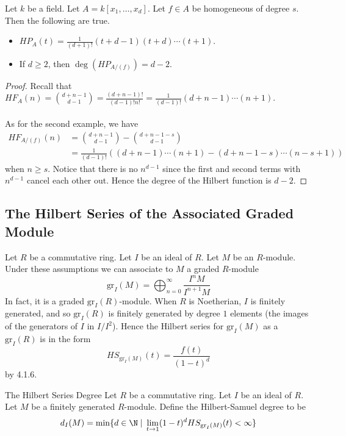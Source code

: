 \documentclass[a4paper]{article}
\begin{document}
\begin{eg}{}{} Let $k$ be a field. Let $A=k[x_1,\dots,x_d]$. Let $f\in A$ be homogeneous of degree $s$. Then the following are true. 
\begin{itemize}
\item $HP_A(t)=\frac{1}{(d+1)!}(t+d-1)(t+d)\cdots(t+1)$. 
\item If $d\geq 2$, then $\deg(HP_{A/(f)})=d-2$. 
\end{itemize} 
\begin{proof}
Recall that $HF_A(n)=\binom{d+n-1}{d-1}=\frac{(d+n-1)!}{(d-1)!n!}=\frac{1}{(d-1)!}(d+n-1)\cdots(n+1)$. \\~\\

As for the second example, we have 
\begin{align*}
HF_{A/(f)}(n)&=\binom{d+n-1}{d-1}-\binom{d+n-1-s}{d-1}\\
&=\frac{1}{(d-1)!}\left((d+n-1)\cdots(n+1)-(d+n-1-s)\cdots(n-s+1)\right)
\end{align*} when $n\geq s$. Notice that there is no $n^{d-1}$ since the first and second terms with $n^{d-1}$ cancel each other out. Hence the degree of the Hilbert function is $d-2$. 
\end{proof}
\end{eg}

\subsection{The Hilbert Series of the Associated Graded Module}
Let $R$ be a commutative ring. Let $I$ be an ideal of $R$. Let $M$ be an $R$-module. Under these assumptions we can associate to $M$ a graded $R$-module $$\text{gr}_I(M)=\bigoplus_{n=0}^\infty\frac{I^nM}{I^{n+1}M}$$ In fact, it is a graded $\text{gr}_I(R)$-module. When $R$ is Noetherian, $I$ is finitely generated, and so $\text{gr}_I(R)$ is finitely generated by degree $1$ elements (the images of the generators of $I$ in $I/I^2$). Hence the Hilbert series for $\text{gr}_I(M)$ as a $\text{gr}_I(R)$ is in the form $$HS_{\text{gr}_I(M)}(t)=\frac{f(t)}{(1-t)^d}$$ by 4.1.6. 

\begin{defn}{The Hilbert Series Degree}{} Let $R$ be a commutative ring. Let $I$ be an ideal of $R$. Let $M$ be a finitely generated $R$-module. Define the Hilbert-Samuel degree to be $$d_I(M)=\min\{d\in\N\;|\;\lim_{t\to 1}(1-t)^dHS_{\text{gr}_I(M)}(t)<\infty\}$$ 
\end{defn}
\end{document}
